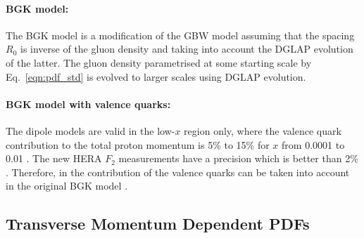 \paragraph{BGK model:} \rm
The BGK model is a modification of the GBW model assuming that the
spacing $R_0$ is inverse of the gluon density and taking
into account the DGLAP evolution of the latter.
The gluon density parametrised at some starting scale by Eq.~\ref{eqn:pdf_std}
is evolved to larger scales using DGLAP evolution.

\paragraph{BGK model with valence quarks:} \rm

The dipole models are valid in the low-$x$ region only, where the valence quark contribution to the total proton momentum 
is 5\% to 15\% for $x$ from 0.0001 to 0.01 \cite{Collaboration:2010ry}.
The new HERA $F_2$ measurements have a precision which is better than 2$\%$. 
Therefore, in \fitter the contribution of the valence quarks can be taken into account in the original 
BGK model \cite{Luszczak:2013rxa}.

\subsection{Transverse Momentum Dependent PDFs}


